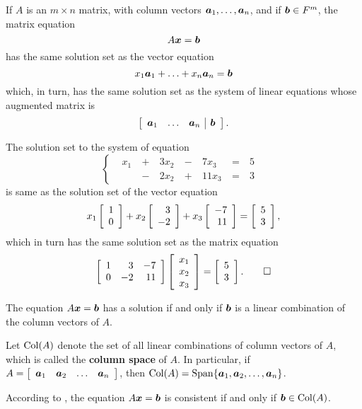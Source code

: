 \begin{Thm} If $A$ is an $m\times n$ matrix, with column vectors $\bb a_1, \ldots, \bb a_n$, and if $\bb b\in F^m$, the matrix equation 
\begin{equation} A\bb x = \bb b\end{equation} has the same solution set as the vector equation 
\[x_1\bb a_1 + \ldots + x_n\bb a_n = \bb b\] which, in turn, has the same solution set as the system of linear equations whose augmented matrix is \[\mtx{rrr|r}{\bb a_1 & \ldots & \bb a_n & \bb b}.\]
\end{Thm}\vs

\begin{Exam} The solution set to the system of equation 
\[\left\{\begin{alignedat}{10}
& x_1\ &+\ &3x_2\ &-\ &7x_3\ &=\ &5&\\
& &-\ & 2x_2\ &+\ & 11x_3\ &=\ &3&
\end{alignedat}\right.\] is same as the solution set of the vector equation
\[x_1\vr{1\\0} + x_2\vr{3\\-2} + x_3\vr{-7\\11} = \vr{5\\3},\] which in turn has the same solution set as the matrix equation
\[\mtx{rrr}{1&3&-7\\0&-2&11}\vr{x_1\\x_2\\x_3} = \vr{5\\3}. \qedhere\]
\end{Exam}\vs 

\begin{Cor}\label{col} The equation $A\bb x = \bb b$ has a solution if and only if $\bb b$ is a linear combination of the column vectors of $A$.\end{Cor}\vs

\begin{Def} Let $\col(A)$ denote the set of all linear combinations of column vectors of $A$, which is called the \textbf{column space} of $A$. In particular, if $A = \mtx{cccc}{\bb a_1 & \bb a_2 & \ldots & \bb a_n}$, then $\col(A)  = \Span\{\bb a_1, \bb a_2, \ldots, \bb a_n\}$.\end{Def}\vs

According to , the equation $A\bb x = \bb b$ is consistent if and only if $\bb b\in \col(A)$.\\

